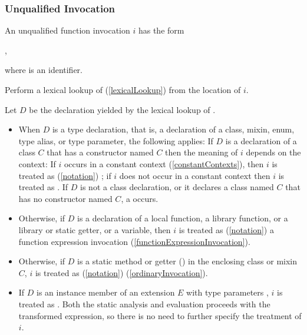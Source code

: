 \documentclass[makeidx]{article}
\begin{document}
{\subsubsection{Unqualified Invocation}

\LMHash{}%
An unqualified function invocation $i$ has the form

\noindent
{},

\noindent
where \id{} is an identifier.


\LMHash{}%
Perform a lexical lookup of \id{}
(\ref{lexicalLookup})
from the location of $i$.

\LMHash{}%
Let $D$ be the declaration yielded by the lexical lookup of \id.

\begin{itemize}
\item
  When $D$ is a type declaration, that is,
  a declaration of a class, mixin, enum, type alias, or type parameter,
  the following applies:
  If $D$ is a declaration of a class $C$
  that has a constructor named $C$
  then the meaning of $i$ depends on the context:
  If $i$ occurs in a constant context
  (\ref{constantContexts}),
  then $i$ is treated as
  (\ref{notation})
  ;
  if $i$ does not occur in a constant context
  then $i$ is treated as .
  If $D$ is not a class declaration,
  or it declares a class named $C$ that has no constructor named $C$,
  a  occurs.
\item
  Otherwise, if $D$ is a declaration of
  a local function,
  a library function, or
  a library or static getter, or a variable,
  then $i$ is treated as
  (\ref{notation})
  a function expression invocation
  (\ref{functionExpressionInvocation}).
\item
  Otherwise, if $D$ is
  a static method or getter
  ()
  in the enclosing class or mixin $C$,
  $i$ is treated as
  (\ref{notation})
  (\ref{ordinaryInvocation}).
\item
  If $D$ is an instance member of an extension $E$
  with type parameters ,
  $i$ is treated as .
  Both the static analysis and evaluation
  proceeds with the transformed expression,
  so there is no need to further specify the treatment of $i$.


\end{itemize}}
\end{document}
